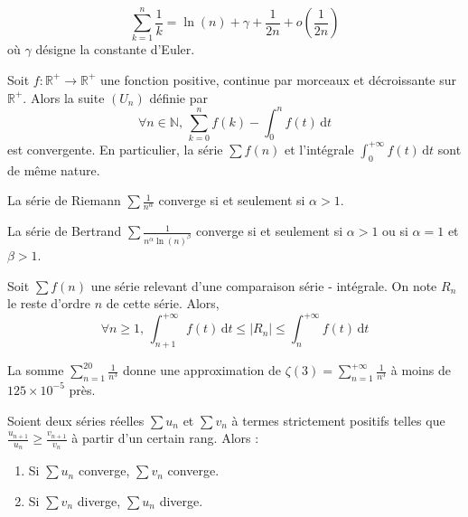 
	\begin{application}
		\[ \sum_{k=1}^n \frac{1}{k} = \ln(n) + \gamma + \frac{1}{2n} + o \left( \frac{1}{2n} \right) \]
		où $\gamma$ désigne la constante d'Euler.
	\end{application}

	\begin{proposition}
		Soit $f : \mathbb{R}^+ \rightarrow \mathbb{R}^+$ une fonction positive, continue par morceaux et décroissante sur $\mathbb{R}^+$. Alors la suite $(U_n)$ définie par
		\[ \forall n \in \mathbb{N}, \, \sum_{k=0}^n f(k) - \int_0^n f(t) \, \mathrm{d}t \]
		est convergente. En particulier, la série $\sum f(n)$ et l'intégrale $\int_0^{+\infty} f(t) \, \mathrm{d}t$ sont de même nature.
	\end{proposition}

	\begin{example}
		La série de Riemann $\sum \frac{1}{n^\alpha}$ converge si et seulement si $\alpha > 1$.
	\end{example}

	\begin{example}
		La série de Bertrand $\sum \frac{1}{n^\alpha \ln(n)^\beta}$ converge si et seulement si $\alpha > 1$ ou si $\alpha = 1$ et $\beta > 1$.
	\end{example}


	\begin{proposition}
		Soit $\sum f(n)$ une série relevant d'une comparaison série - intégrale. On note $R_n$ le reste d'ordre $n$ de cette série. Alors,
		\[ \forall n \geq 1, \, \int_{n+1}^{+\infty} f(t) \, \mathrm{d}t \leq |R_n| \leq \int_{n}^{+\infty} f(t) \, \mathrm{d}t \]
	\end{proposition}

	\begin{example}
		La somme $\sum_{n=1}^{20} \frac{1}{n^3}$ donne une approximation de $\zeta(3) = \sum_{n=1}^{+\infty} \frac{1}{n^3}$ à moins de $125 \times 10^{-5}$ près.
	\end{example}


	\begin{proposition}
		Soient deux séries réelles $\sum u_n$ et $\sum v_n$ à termes strictement positifs telles que $\frac{u_{n+1}}{u_n} \geq \frac{v_{n+1}}{v_n}$ à partir d'un certain rang. Alors :
		\begin{enumerate}[label=(\roman*)]
			\item Si $\sum u_n$ converge, $\sum v_n$ converge.
			\item Si $\sum v_n$ diverge, $\sum u_n$ diverge.
		\end{enumerate}
	\end{proposition}

